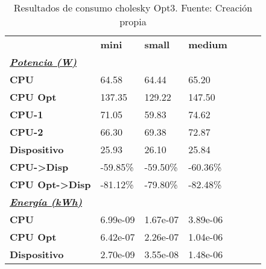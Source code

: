 \begin{table}[H]
    \centering
    \begin{tabular}{lllllll}
    \rowcolor[HTML]{DAE8FC} \ & \textbf{mini} & \textbf{	small} & \textbf{	medium} \\
    \cellcolor[HTML]{DAE8FC} \textbf{\textbf{{\emph{{\underline{{Potencia (W)}}}}}}} &  & 	 & 	 \\
    \rowcolor[HTML]{EFEFEF} \cellcolor[HTML]{DAE8FC} \textbf{CPU} & 64.58 & 	64.44 & 	65.20 \\
    \cellcolor[HTML]{DAE8FC} \textbf{CPU Opt} & 137.35 & 	129.22 & 	147.50 \\
    \rowcolor[HTML]{EFEFEF} \cellcolor[HTML]{DAE8FC} \textbf{\quad CPU-1} & 71.05 & 	59.83 & 	74.62 \\
    \cellcolor[HTML]{DAE8FC} \textbf{\quad CPU-2} & 66.30 & 	69.38 & 	72.87 \\
    \rowcolor[HTML]{EFEFEF} \cellcolor[HTML]{DAE8FC} \textbf{Dispositivo} & 25.93 & 	26.10 & 	25.84 \\
    \cellcolor[HTML]{DAE8FC} \textbf{CPU->Disp} & -59.85\% & 	-59.50\% & 	-60.36\% \\
    \rowcolor[HTML]{EFEFEF} \cellcolor[HTML]{DAE8FC} \textbf{CPU Opt->Disp} & -81.12\% & 	-79.80\% & 	-82.48\% \\
    \cellcolor[HTML]{DAE8FC} \textbf{\textbf{{\emph{{\underline{{Energía (kWh)}}}}}}} &  & 	 & 	 \\
    \rowcolor[HTML]{EFEFEF} \cellcolor[HTML]{DAE8FC} \textbf{CPU} & 6.99e-09 & 	1.67e-07 & 	3.89e-06 \\
    \cellcolor[HTML]{DAE8FC} \textbf{CPU Opt} & 6.42e-07 & 	2.26e-07 & 	1.04e-06 \\
    \rowcolor[HTML]{EFEFEF} \cellcolor[HTML]{DAE8FC} \textbf{Dispositivo} & 2.70e-09 & 	3.55e-08 & 	1.48e-06 \\
    \end{tabular}
    \caption[Resultados de consumo cholesky Opt3]{{Resultados de consumo cholesky Opt3. Fuente: Creación propia}}
    \label{table_test_cholesky_Opt3_hw_powerResults}
\end{table}